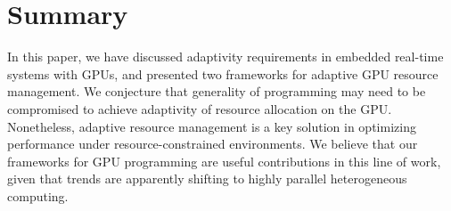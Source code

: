 \documentclass[times, 10pt, twocolumn]{article}
\begin{document}
\section{Summary}
\label{sec:summary}

In this paper, we have discussed adaptivity requirements in embedded
real-time systems with GPUs, and presented two frameworks for adaptive
GPU resource management.
We conjecture that generality of programming may need to be compromised
to achieve adaptivity of resource allocation on the GPU.
Nonetheless, adaptive resource management is a key solution in
optimizing performance under resource-constrained environments.
We believe that our frameworks for GPU programming are useful
contributions in this line of work, given that trends are apparently
shifting to highly parallel heterogeneous computing.


{\footnotesize

}
\end{document}
